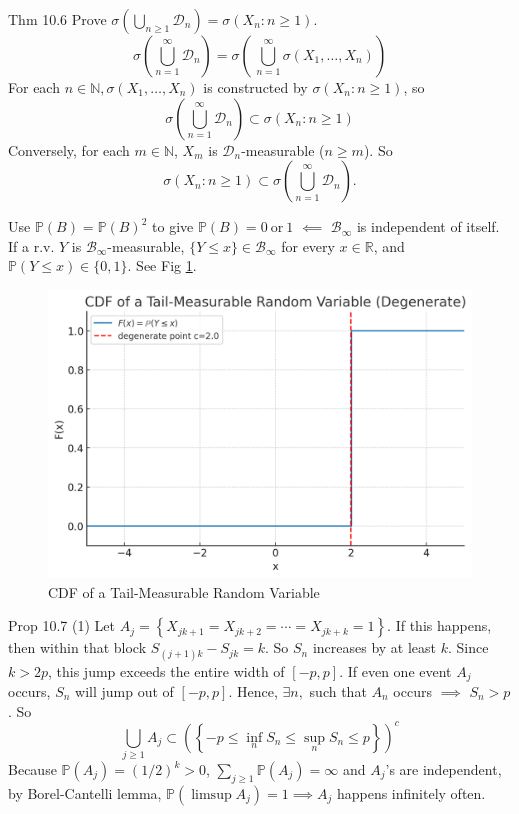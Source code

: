 \begin{note}{Thm 10.6}
    Prove $\sigma(\bigcup_{n\ge 1}\mathcal{D}_n)=\sigma(X_n:n\ge 1)$. 
    \[
    \sigma\!\left(\bigcup_{n=1}^\infty \mathcal{D}_n\right)
= \sigma\!\left(\,\bigcup_{n=1}^\infty \sigma(X_1,\dots,X_n)\right)
    \]
    For each $n\in\mathbb{N}, \sigma(X_1,\dots,X_n)$ is constructed by $\sigma(X_n:n\ge 1)$, so
    \[
    \sigma\!\left(\bigcup_{n=1}^\infty \mathcal{D}_n\right)\subset \sigma(X_n:n\ge 1)
    \]
    Conversely, for each $m\in\mathbb{N}$, $X_m$ is $\mathcal{D}_n$-measurable ($n\ge m$). So
    \[
    \sigma(X_n:n\ge 1)\subset \sigma\!\left(\bigcup_{n=1}^\infty \mathcal{D}_n\right).
    \]
    \begin{remark}
        Use $\mathbb{P}(B)=\mathbb{P}(B)^2$ to give $\mathbb{P}(B)=0\ \text{or}\ 1$ $\impliedby$ $\mathcal{B}_{\infty}$ is independent of itself. If a r.v. $Y$ is $\mathcal{B}_{\infty}$-measurable, $\{Y\le x\}\in\mathcal{B}_{\infty}$ for every $x\in\mathbb{R}$, and $\mathbb{P}(Y\le x)\in\{0,1\}$. See Fig \ref{fig:cdf}.
    \end{remark}
    \begin{figure}[htbp]
        \centering
        \includegraphics[width=0.65\linewidth]{fig/CDF of a Tail-Measurable Random Variable.png}
        \caption{CDF of a Tail-Measurable Random Variable}
        \label{fig:cdf}
    \end{figure}
\end{note}

\begin{note}{Prop 10.7}
    (1) Let $A_j = \left\{X_{jk+1} = X_{jk+2} = \cdots = X_{jk+k} = 1\right\}$. If this happens, then within that block $S_{(j+1)k}-S_{jk}=k$. So $S_n$ increases by at least $k$. Since $k > 2p$, this jump exceeds the entire width of $[-p, p]$. If even one event $A_j$ occurs, $S_n$ will jump out of $[-p,p]$. Hence, $\exists n,$ such that $A_n$ occurs $\implies$ $S_n>p$. So 
    \[
    \bigcup_{j\ge 1}A_j\subset \left(\left\{-p \leq \inf _{n} S_{n} \leq \sup _{n} S_{n} \leq p\right\}\right)^{c}
    \]
    Because $\mathbb{P}(A_j)=(1/2)^k>0$, $\sum_{j\ge 1}\mathbb{P}(A_j)=\infty$ and $A_j$'s are independent, by Borel-Cantelli lemma, $\mathbb{P}(\limsup A_j)=1\implies A_j$ happens infinitely often.
\end{note}

